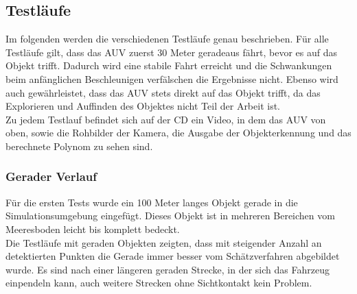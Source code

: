 \subsection{Testläufe}
Im folgenden werden die verschiedenen Testläufe genau beschrieben. Für alle Testläufe gilt, dass das AUV zuerst 30 Meter geradeaus fährt, bevor es auf das Objekt trifft. Dadurch wird eine stabile Fahrt erreicht und die Schwankungen beim anfänglichen Beschleunigen verfälschen die Ergebnisse nicht. Ebenso wird auch gewährleistet, dass das AUV stets direkt auf das Objekt trifft, da das Explorieren und Auffinden des Objektes nicht Teil der Arbeit ist.\\
Zu jedem Testlauf befindet sich auf der CD ein Video, in dem das AUV von oben, sowie die Rohbilder der Kamera, die Ausgabe der Objekterkennung und das berechnete Polynom zu sehen sind.
\subsubsection{Gerader Verlauf}
Für die ersten Tests wurde ein 100 Meter langes Objekt gerade in die Simulationsumgebung eingefügt. Dieses Objekt ist in mehreren Bereichen vom Meeresboden leicht bis komplett bedeckt.\\
Die Testläufe mit geraden Objekten zeigten, dass mit steigender Anzahl an detektierten Punkten die Gerade immer besser vom Schätzverfahren abgebildet wurde. Es sind nach einer längeren geraden Strecke, in der sich das Fahrzeug einpendeln kann, auch weitere Strecken ohne Sichtkontakt kein Problem.\\

